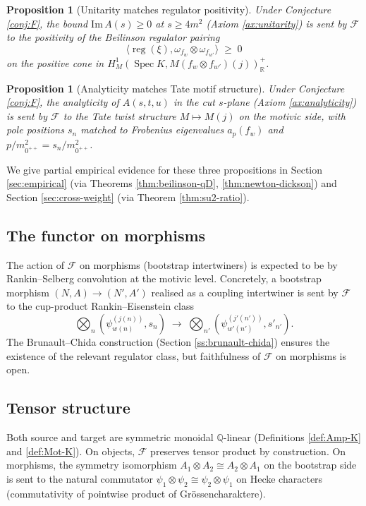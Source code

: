 \documentclass[11pt]{amsart}
\newtheorem{proposition}[theorem]{Proposition}
\theoremstyle{definition}
\theoremstyle{remark}
\DeclareMathOperator{\Spec}{Spec}
\DeclareMathOperator{\reg}{reg}
\newcommand{\Q}{\mathbb{Q}}
\newcommand{\R}{\mathbb{R}}
\begin{document}
\begin{proposition}[Unitarity matches regulator positivity]\label{prop:F-unitarity-regulator}
Under Conjecture \ref{conj:F}, the bound $\mathrm{Im}\, A(s) \ge 0$ at
$s \ge 4m^2$ (Axiom \ref{ax:unitarity}) is sent by $\mathcal{F}$ to the
positivity of the Beilinson regulator pairing
\[
\langle \reg(\xi), \omega_{f_w} \otimes \omega_{f_{w'}} \rangle \;\ge\; 0
\]
on the positive cone in $H^1_M(\Spec K, M(f_w \otimes f_{w'})(j))_\R^+$.
\end{proposition}

\begin{proposition}[Analyticity matches Tate motif structure]\label{prop:F-analyticity-Tate}
Under Conjecture \ref{conj:F}, the analyticity of $A(s, t, u)$ in the
cut $s$-plane (Axiom \ref{ax:analyticity}) is sent by $\mathcal{F}$ to the
Tate twist structure $M \mapsto M(j)$ on the motivic side, with pole
positions $s_n$ matched to Frobenius eigenvalues $a_p(f_w)$ and
$p / m_{0^{++}}^2 = s_n / m_{0^{++}}^2$.
\end{proposition}

We give partial empirical evidence for these three propositions in
Section \ref{sec:empirical} (via Theorems \ref{thm:beilinson-qD},
\ref{thm:newton-dickson}) and Section \ref{sec:cross-weight} (via
Theorem \ref{thm:su2-ratio}).

\subsection{The functor on morphisms}\label{ss:F-morphisms}

The action of $\mathcal{F}$ on morphisms (bootstrap intertwiners) is
expected to be by Rankin--Selberg convolution at the motivic level.
Concretely, a bootstrap morphism
$(N, A) \to (N', A')$ realised as a coupling intertwiner is sent by
$\mathcal{F}$ to the cup-product Rankin--Eisenstein class
\[
\bigotimes_n (\psi_{w(n)}^{(j(n))}, s_n) \;\longrightarrow\;
\bigotimes_{n'} (\psi_{w'(n')}^{(j'(n'))}, s'_{n'}).
\]
The Brunault--Chida construction (Section \ref{ss:brunault-chida})
ensures the existence of the relevant regulator class, but
faithfulness of $\mathcal{F}$ on morphisms is open.

\subsection{Tensor structure}\label{ss:F-tensor}

Both source and target are symmetric monoidal $\Q$-linear (Definitions
\ref{def:Amp-K} and \ref{def:Mot-K}). On objects, $\mathcal{F}$ preserves
tensor product by construction. On morphisms, the symmetry isomorphism
$A_1 \otimes A_2 \cong A_2 \otimes A_1$ on the bootstrap side is sent to
the natural commutator
$\psi_1 \otimes \psi_2 \cong \psi_2 \otimes \psi_1$ on Hecke characters
(commutativity of pointwise product of Gr\"ossencharaktere).
\end{document}
